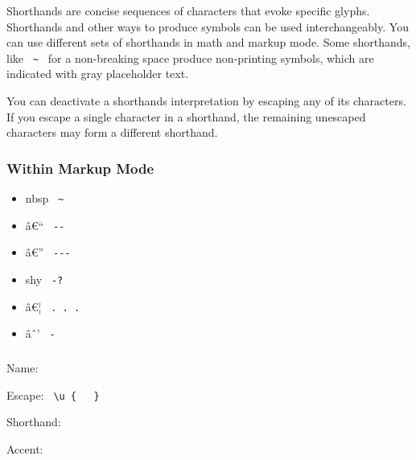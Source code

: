 Shorthands are concise sequences of characters that evoke specific
glyphs. Shorthands and other ways to produce symbols can be used
interchangeably. You can use different sets of shorthands in math and
markup mode. Some shorthands, like \texttt{\ \textasciitilde{}\ } for a
non-breaking space produce non-printing symbols, which are indicated
with gray placeholder text.

You can deactivate a shorthand\textquotesingle s interpretation by
escaping any of its characters. If you escape a single character in a
shorthand, the remaining unescaped characters may form a different
shorthand.

\subsubsection{Within Markup Mode}\label{within-markup-mode}

\begin{itemize}
\tightlist
\item
  \label{symbol-space.nobreak}{{ nbsp }
  \texttt{\ \textasciitilde{}\ }}
\item
  \label{symbol-dash.en}{{ â€`` } \texttt{\ -\/-\ }}
\item
  \label{symbol-dash.em}{{ â€'' } \texttt{\ -\/-\/-\ }}
\item
  \label{symbol-hyph.soft}{{ shy } \texttt{\ -?\ }}
\item
  \label{symbol-dots.h}{{ â€¦ } \texttt{\ .\ .\ .\ }}
\item
  \label{symbol-minus}{{ âˆ' } \texttt{\ -\ }}
\end{itemize}

{ }

\subsubsection{\texorpdfstring{{ }}{ }}\label{section}

Name: \texttt{\ }


Escape: \texttt{\ \textbackslash{}u\ \{\ }{\texttt{\ }}\texttt{\ \}\ }


Shorthand: \texttt{\ }

{ }

Accent:



